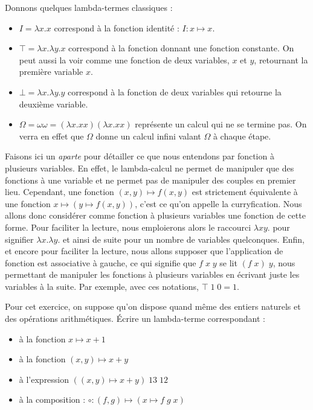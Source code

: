\begin{expl}
    Donnons quelques lambda-termes classiques :
    \begin{itemize}[label=$\bullet$]
        \item $I = \lambda x.x$ correspond à la fonction identité : $I : x\mapsto x$.
        \item $\top = \lambda x. \lambda y.x$ correspond à la fonction donnant une fonction constante. On peut aussi la voir comme une fonction de deux variables, $x$ et $y$, retournant la première variable $x$.
        \item $\bot = \lambda x.\lambda y. y$ correspond à la fonction de deux variables qui retourne la deuxième variable.
        \item $\Omega = \omega \omega = (\lambda x.xx)(\lambda x.xx)$ représente un calcul qui ne se termine pas. On verra en effet que $\Omega$ donne un calcul infini valant $\Omega$ à chaque étape.
    \end{itemize}
\end{expl}

Faisons ici un \textit{aparte} pour détailler ce que nous entendons par fonction à plusieurs variables. En effet, le lambda-calcul ne permet de manipuler que des fonctions à une variable et ne permet pas de manipuler des couples en premier lieu. Cependant, une fonction $(x,y)\mapsto f(x,y)$ est strictement équivalente à une fonction $x\mapsto (y\mapsto f(x,y))$, c'est ce qu'on appelle la curryfication. Nous allons donc considérer comme fonction à plusieurs variables une fonction de cette forme. Pour faciliter la lecture, nous emploierons alors le raccourci $\lambda x y.$ pour signifier $\lambda x.\lambda y.$ et ainsi de suite pour un nombre de variables quelconques. Enfin, et encore pour faciliter la lecture, nous allons supposer que l'application de fonction est associative à gauche, ce qui signifie que $f\;x\;y$ se lit $(f\;x)\;y$, nous permettant de manipuler les fonctions à plusieurs variables en écrivant juste les variables à la suite. Par exemple, avec ces notations, $\top\;1\;0 = 1$.


\begin{exo}
    Pour cet exercice, on suppose qu'on dispose quand même des entiers naturels et des opérations arithmétiques. \'Ecrire un lambda-terme correspondant :
    \begin{itemize}[label=$\bullet$]
        \item à la fonction $x \mapsto x+1$
        \item à la fonction $(x,y)\mapsto x+y$
        \item à l'expression $((x,y)\mapsto x+y)\;13\;12$
        \item à la composition : $\circ : (f,g) \mapsto (x\mapsto f\; g \; x)$
    \end{itemize}
\end{exo}

